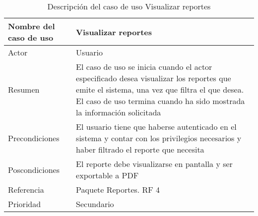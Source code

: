 \begin{table}[H]
	\sf
	\begin{supertabular}{|p{4.5cm}|p{12cm}|}
		\hline
		\textbf{Nombre del caso de uso}
		& \textbf{Visualizar reportes} \\ \hline
		
		Actor
		& Usuario \\ \hline
		
		Resumen
		& El caso de uso se inicia cuando el actor especificado desea visualizar los reportes que emite el sistema, una vez que filtra el que desea. El caso de uso termina cuando ha sido mostrada la información solicitada \\ \hline
		
		Precondiciones
		& El usuario tiene que haberse autenticado en el sistema y contar con los privilegios necesarios y haber filtrado el reporte que necesita \\ \hline
		
		Poscondiciones
		& El reporte debe visualizarse en pantalla y ser exportable a PDF \\ \hline
		
		Referencia
		& Paquete Reportes. RF 4 \\ \hline
		
		Prioridad
		& Secundario \\		
		\hline
	\end{supertabular}
	\caption[Descripción del caso de uso Visualizar reportes]{Descripción del caso de uso Visualizar reportes}
	\label{table:CU_VisualRep}
\end{table}

